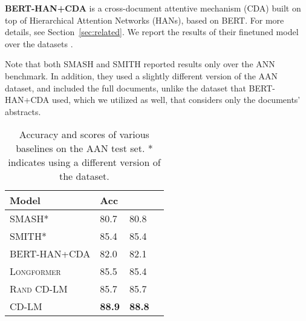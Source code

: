 \documentclass[11pt,a4paper]{article}
\begin{document}
{\bf \textsc{BERT-HAN+CDA}} \cite{zhou-etal-2020-multilevel} is a cross-document attentive mechanism (CDA) built on top of Hierarchical Attention Networks (HANs), based on BERT. For more details, see Section~\ref{sec:related}. We report the results of their finetuned model over the datasets \cite[Section~5.2]{zhou-etal-2020-multilevel}. 

Note that both SMASH and SMITH reported results only over the ANN benchmark. In addition, they used a slightly different version of the AAN dataset, and included the full documents, unlike the dataset that \textsc{BERT-HAN+CDA} used, which we utilized as well, that considers only the documents' abstracts.  

\begin{table}[bt]
\centering
\small
  \def\arraystretch{1.12}\tabcolsep=6pt    
\begin{tabular}{llll}
                      \toprule
Model               & Acc           &    \\ \toprule
\textsc{SMASH}* & 80.7       & 80.8 \\
\textsc{SMITH}* & 85.4      & 85.4\\
\textsc{BERT-HAN+CDA} & 82.0      & 82.1\\
\midrule
\textsc{Longformer} & 85.5 & 85.4 \\
\textsc{Rand CD-LM} & 85.7 & 85.7\\
\textsc{CD-LM} & \textbf{88.9} & \textbf{88.8} \\

\bottomrule
\end{tabular}
\caption{Accuracy and  scores of various baselines on the AAN test set. * indicates using a different version of the dataset\footnotemark.}\smallskip 
\label{tab:aan}
\vspace{-3mm}
\end{table}
\end{document}
